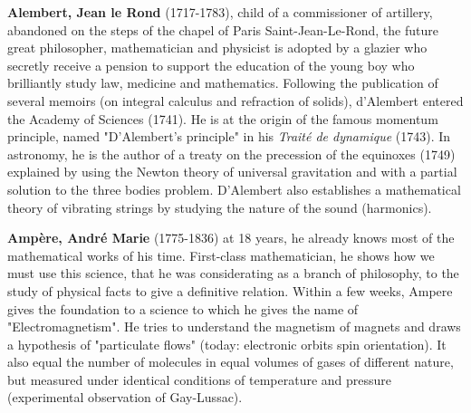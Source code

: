 \pichskip{15pt}%
\textbf{Alembert, Jean le Rond} (1717-1783), child of a commissioner of artillery, abandoned on the steps of the chapel of Paris Saint-Jean-Le-Rond, the future great philosopher, mathematician and physicist is adopted by a glazier who secretly receive a pension to support the education of the young boy who brilliantly study law, medicine and mathematics. Following the publication of several memoirs (on integral calculus and refraction of solids), d'Alembert entered the Academy of Sciences (1741). He is at the origin of the famous momentum principle, named "D'Alembert's principle" in his \textit{ Traité de dynamique} (1743). In astronomy, he is the author of a treaty on the precession of the equinoxes (1749) explained by using the Newton theory of universal gravitation and with a partial solution to the three bodies problem. D'Alembert also establishes a mathematical theory of vibrating strings by studying the nature of the sound (harmonics).

\pichskip{15pt}%
\textbf{Ampère, André Marie} (1775-1836) at 18 years, he already knows most of the mathematical works of his time. First-class mathematician, he shows how we must use this science, that he was considerating as a branch of philosophy, to the study of physical facts to give a definitive relation. Within a few weeks, Ampere gives the foundation to a science to which he gives the name of "Electromagnetism". He tries to understand the magnetism of magnets and draws a hypothesis of "particulate flows" (today: electronic orbits spin orientation). It also equal the number of molecules in equal volumes of gases of different nature, but measured under identical conditions of temperature and pressure (experimental observation of Gay-Lussac).

